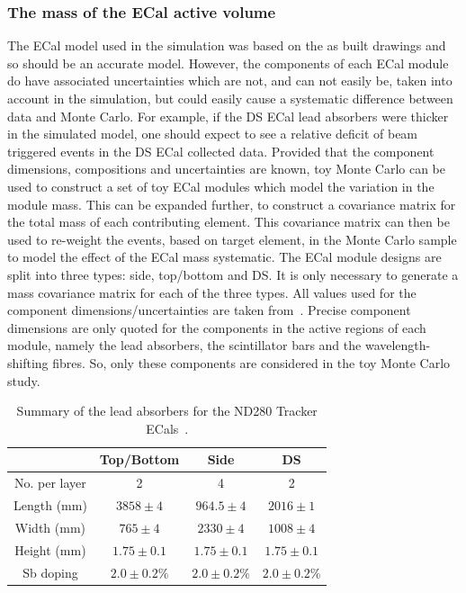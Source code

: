 \subsubsection{The mass of the ECal active volume}
The ECal model used in the simulation was based on the as built drawings and so should be an accurate model.  However, the components of each ECal module do have associated uncertainties which are not, and can not easily be, taken into account in the simulation, but could easily cause a systematic difference between data and Monte Carlo.  For example, if the DS ECal lead absorbers were thicker in the simulated model, one should expect to see a relative deficit of beam triggered events in the DS ECal collected data.  Provided that the component dimensions, compositions and uncertainties are known, toy Monte Carlo can be used to construct a set of toy ECal modules which model the variation in the module mass.  This can be expanded further, to construct a covariance matrix for the total mass of each contributing element.  This covariance matrix can then be used to re-weight the events, based on target element, in the Monte Carlo sample to model the effect of the ECal mass systematic.  
\newline
\newline
The ECal module designs are split into three types: side, top/bottom and DS.  It is only necessary to generate a mass covariance matrix for each of the three types.  All values used for the component dimensions/uncertainties are taken from~\cite{1748-0221-8-10-P10019}.  Precise component dimensions are only quoted for the components in the active regions of each module, namely the lead absorbers, the scintillator bars and the wavelength-shifting fibres.  So, only these components are considered in the toy Monte Carlo study.  
\begin{table}[t!]
  \begin{tabular}{ c c c c }
     & Top/Bottom & Side & DS \\ \hline \hline
  No. per layer & 2 & 4 & 2 \\
  Length (mm) & $3858\pm4$ & $964.5\pm4$ & $2016\pm1$ \\
  Width (mm) & $765\pm4$ & $2330\pm4$ & $1008\pm4$ \\
  Height (mm) & $1.75\pm0.1$ & $1.75\pm0.1$ & $1.75\pm0.1$ \\
  Sb doping & $2.0\pm0.2\%$ & $2.0\pm0.2\%$ & $2.0\pm0.2\%$ \\
  \end{tabular}
  \caption{Summary of the lead absorbers for the ND280 Tracker ECals~\cite{1748-0221-8-10-P10019}.}
  \label{table:LeadAbsorberDimensions}
\end{table}


